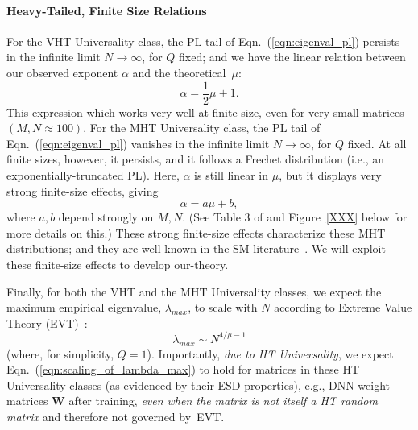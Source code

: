 \paragraph{Heavy-Tailed, Finite Size Relations} 


For the VHT Universality class, the PL tail of Eqn.~(\ref{eqn:eigenval_pl}) persists in the infinite limit $N\rightarrow\infty$, for $Q$ fixed; and
we have the linear relation between our observed exponent $\alpha$ and the theoretical~$\mu$:
\begin{equation}
\alpha=\frac{1}{2}\mu+1  .
\label{eqn:alpha_mu_vht}
\end{equation}
This expression which works very well at finite size, even for very small matrices $(M,N\approx100)$.
%
For the MHT Universality class, the PL tail of Eqn.~(\ref{eqn:eigenval_pl}) vanishes in the infinite limit $N\rightarrow\infty$, for $Q$ fixed.
At all finite sizes, however, it persists, and it follows a Frechet distribution (i.e., an exponentially-truncated PL). 
Here, $\alpha$ is still linear in $\mu$, but it displays very strong finite-size effects, giving 
\begin{equation}
\alpha=a\mu+b, 
\label{eqn:alpha_mu_mht}
\end{equation}
where $a,b$ depend strongly on $M,N$. 
(See Table 3 of \cite{MM18_TR} and Figure~\ref{XXX} below for more details on this.)
These strong finite-size effects characterize these MHT distributions; and they are well-known in the SM literature~\cite{SornetteBook,BouchaudPotters03}. 
We will exploit these finite-size effects to develop our-theory.

Finally, for both the VHT and the MHT Universality classes, we expect the maximum empirical eigenvalue, $\lambda_{max}$, to scale with $N$
according to Extreme Value Theory (EVT)~\cite{heavytails2007,Resnick07,MM18_TR}:
\begin{equation}
\lambda_{max}\sim N^{4/\mu-1}  
\label{eqn:scaling_of_lambda_max}
\end{equation}
(where, for simplicity, $Q=1$).
Importantly, \emph{due to HT Universality}, we expect Eqn.~(\ref{eqn:scaling_of_lambda_max}) to hold for matrices in these HT Universality classes (as evidenced by their ESD properties), e.g., DNN weight matrices $\mathbf{W}$ after training, \emph{even when the matrix is not itself a HT random matrix} and therefore not governed by~EVT.



